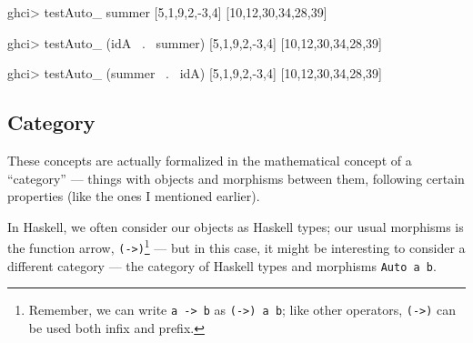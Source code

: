 \documentclass[]{article}
\newenvironment{Shaded}{}{}
\newcommand{\DecValTok}[1]{\textcolor[rgb]{0.25,0.63,0.44}{{#1}}}
\newcommand{\FunctionTok}[1]{\textcolor[rgb]{0.02,0.16,0.49}{{#1}}}
\newcommand{\NormalTok}[1]{{#1}}
\begin{document}
\begin{Shaded}
\begin{Highlighting}[]
\NormalTok{ghci}\FunctionTok{>} \NormalTok{testAuto_ summer [}\DecValTok{5}\NormalTok{,}\DecValTok{1}\NormalTok{,}\DecValTok{9}\NormalTok{,}\DecValTok{2}\NormalTok{,}\FunctionTok{-}\DecValTok{3}\NormalTok{,}\DecValTok{4}\NormalTok{]}
\NormalTok{[}\DecValTok{10}\NormalTok{,}\DecValTok{12}\NormalTok{,}\DecValTok{30}\NormalTok{,}\DecValTok{34}\NormalTok{,}\DecValTok{28}\NormalTok{,}\DecValTok{39}\NormalTok{]}

\NormalTok{ghci}\FunctionTok{>} \NormalTok{testAuto_ (idA }\FunctionTok{~.~} \NormalTok{summer) [}\DecValTok{5}\NormalTok{,}\DecValTok{1}\NormalTok{,}\DecValTok{9}\NormalTok{,}\DecValTok{2}\NormalTok{,}\FunctionTok{-}\DecValTok{3}\NormalTok{,}\DecValTok{4}\NormalTok{]}
\NormalTok{[}\DecValTok{10}\NormalTok{,}\DecValTok{12}\NormalTok{,}\DecValTok{30}\NormalTok{,}\DecValTok{34}\NormalTok{,}\DecValTok{28}\NormalTok{,}\DecValTok{39}\NormalTok{]}

\NormalTok{ghci}\FunctionTok{>} \NormalTok{testAuto_ (summer }\FunctionTok{~.~} \NormalTok{idA) [}\DecValTok{5}\NormalTok{,}\DecValTok{1}\NormalTok{,}\DecValTok{9}\NormalTok{,}\DecValTok{2}\NormalTok{,}\FunctionTok{-}\DecValTok{3}\NormalTok{,}\DecValTok{4}\NormalTok{]}
\NormalTok{[}\DecValTok{10}\NormalTok{,}\DecValTok{12}\NormalTok{,}\DecValTok{30}\NormalTok{,}\DecValTok{34}\NormalTok{,}\DecValTok{28}\NormalTok{,}\DecValTok{39}\NormalTok{]}
\end{Highlighting}
\end{Shaded}

\subsection{Category}\label{category}

These concepts are actually formalized in the mathematical concept of a
``category'' --- things with objects and morphisms between them,
following certain properties (like the ones I mentioned earlier).

In Haskell, we often consider our objects as Haskell types; our usual
morphisms is the function arrow, \texttt{(-\textgreater{})}\footnote{Remember,
  we can write \texttt{a\ -\textgreater{}\ b} as
  \texttt{(-\textgreater{})\ a\ b}; like other operators,
  \texttt{(-\textgreater{})} can be used both infix and prefix.} --- but
in this case, it might be interesting to consider a different category
--- the category of Haskell types and morphisms \texttt{Auto\ a\ b}.
\end{document}
